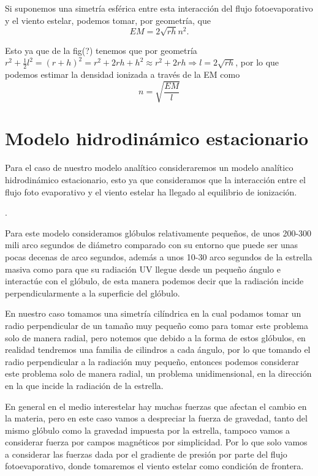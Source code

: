 \documentclass{book}
\begin{document}
Si suponemos una simetría esférica entre esta interacción del flujo fotoevaporativo y el viento estelar, podemos tomar, por geometría, que
\[EM=2\sqrt{rh}n^2.\]


Esto ya que de la fig(?) tenemos que por geometría $r^2+\frac{1}{2}l^2=(r+h)^2=r^2+2rh+h^2\approx r^2+2rh\Rightarrow l=2\sqrt{rh}$, por lo que podemos estimar la densidad ionizada a través de la EM como \[n=\sqrt{\frac{EM}{l}}\]

\section{Modelo hidrodinámico estacionario}

Para el caso de nuestro modelo analítico consideraremos un modelo analítico hidrodinámico estacionario, esto ya que consideramos que la interacción entre el flujo foto evaporativo y el viento estelar ha llegado al equilibrio de ionización.

.

Para este modelo consideramos glóbulos relativamente pequeños, de unos 200-300 mili arco segundos de diámetro comparado con su entorno que puede ser unas pocas decenas de arco segundos, además a unos 10-30 arco segundos de la estrella masiva como para que su radiación UV llegue desde un pequeño ángulo e interactúe con el glóbulo, de esta manera podemos decir que la radiación incide perpendicularmente a la superficie del glóbulo.

En nuestro caso tomamos una simetría cilíndrica en la cual podamos tomar un radio perpendicular de un tamaño muy pequeño como para tomar este problema solo de manera radial, pero notemos que debido a la forma de estos glóbulos, en realidad tendremos una familia de cilindros a cada ángulo, por lo que tomando el radio perpendicular a la radiación muy pequeño, entonces podemos considerar este problema solo de manera radial, un problema unidimensional, en la dirección en la que incide la radiación de la estrella.

En general en el medio interestelar hay muchas fuerzas que afectan el cambio en la materia, pero en este caso vamos a despreciar la fuerza de gravedad, tanto del mismo glóbulo como la gravedad impuesta por la estrella, tampoco vamos a considerar fuerza por campos magnéticos por simplicidad. Por lo que solo vamos a considerar las fuerzas dada por el gradiente de presión por parte del flujo fotoevaporativo, donde tomaremos el viento estelar como condición de frontera.
\end{document}
